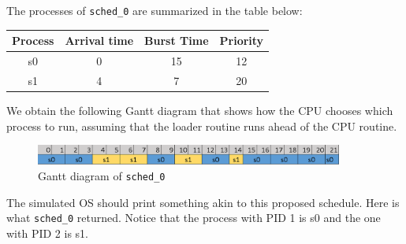 \documentclass[a4paper]{article}
\numberwithin{equation}{section}
\begin{document}
The processes of \texttt{sched_0} are summarized in the table below:

\begin{table}[H]
  \centering
  \begin{tabular}{cccc}
    \toprule
    Process & Arrival time & Burst Time & Priority \\
    \midrule
    s0      & 0            & 15         & 12       \\
    s1      & 4            & 7          & 20       \\
    \bottomrule
  \end{tabular}
\end{table}

We obtain the following Gantt diagram that shows how the CPU chooses which process to run, assuming that the loader routine runs ahead of the CPU routine.

\begin{figure}[H]
  \centering
  \includegraphics[width=0.9\textwidth]{sched_0.png}
  \caption{Gantt diagram of \texttt{sched_0}}
\end{figure}

The simulated OS should print something akin to this proposed schedule.
Here is what \texttt{sched_0} returned.
Notice that the process with PID 1 is s0 and the one with PID 2 is s1.
\end{document}
